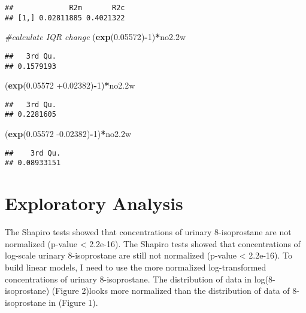 \documentclass[12pt,]{article}
\newenvironment{Shaded}{\begin{snugshade}}{\end{snugshade}}
\newcommand{\CommentTok}[1]{\textcolor[rgb]{0.56,0.35,0.01}{\textit{#1}}}
\newcommand{\DecValTok}[1]{\textcolor[rgb]{0.00,0.00,0.81}{#1}}
\newcommand{\FloatTok}[1]{\textcolor[rgb]{0.00,0.00,0.81}{#1}}
\newcommand{\KeywordTok}[1]{\textcolor[rgb]{0.13,0.29,0.53}{\textbf{#1}}}
\newcommand{\NormalTok}[1]{#1}
\newcommand{\OperatorTok}[1]{\textcolor[rgb]{0.81,0.36,0.00}{\textbf{#1}}}
\begin{document}
\begin{verbatim}
##             R2m       R2c
## [1,] 0.02811885 0.4021322
\end{verbatim}

\begin{Shaded}
\begin{Highlighting}[]
\CommentTok{#calculate IQR change}
\NormalTok{(}\KeywordTok{exp}\NormalTok{(}\FloatTok{0.05572}\NormalTok{)}\OperatorTok{-}\DecValTok{1}\NormalTok{)}\OperatorTok{*}\NormalTok{no2}\FloatTok{.2}\NormalTok{w}
\end{Highlighting}
\end{Shaded}

\begin{verbatim}
##   3rd Qu. 
## 0.1579193
\end{verbatim}

\begin{Shaded}
\begin{Highlighting}[]
\NormalTok{(}\KeywordTok{exp}\NormalTok{(}\FloatTok{0.05572} \FloatTok{+0.02382}\NormalTok{)}\OperatorTok{-}\DecValTok{1}\NormalTok{)}\OperatorTok{*}\NormalTok{no2}\FloatTok{.2}\NormalTok{w}
\end{Highlighting}
\end{Shaded}

\begin{verbatim}
##   3rd Qu. 
## 0.2281605
\end{verbatim}

\begin{Shaded}
\begin{Highlighting}[]
\NormalTok{(}\KeywordTok{exp}\NormalTok{(}\FloatTok{0.05572} \FloatTok{-0.02382}\NormalTok{)}\OperatorTok{-}\DecValTok{1}\NormalTok{)}\OperatorTok{*}\NormalTok{no2}\FloatTok{.2}\NormalTok{w}
\end{Highlighting}
\end{Shaded}

\begin{verbatim}
##    3rd Qu. 
## 0.08933151
\end{verbatim}

\hypertarget{exploratory-analysis}{%
\section{Exploratory Analysis}\label{exploratory-analysis}}

The Shapiro tests showed that concentrations of urinary 8-isoprostane
are not normalized (p-value \textless{} 2.2e-16). The Shapiro tests
showed that concentrations of log-scale urinary 8-isoprostane are still
not normalized (p-value \textless{} 2.2e-16). To build linear models, I
need to use the more normalized log-transformed concentrations of
urinary 8-isoprostane. The distribution of data in log(8-isoprostane)
(Figure 2)looks more normalized than the distribution of data of
8-isoprostane in (Figure 1).
\end{document}

